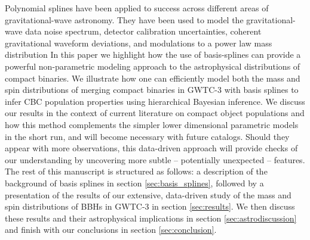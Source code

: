 Polynomial splines have been applied to success across different areas of gravitational-wave astronomy. They have been used to model the gravitational-wave data noise spectrum, 
detector calibration uncertainties, coherent gravitational waveform deviations, and modulations to a power law mass distribution \citep{Littenberg_2015,Edwards_2018,B_Farr_etal_2014,Edelman_2021,Edelman_2022ApJ}
In this paper we highlight how the use of basis-splines can provide a powerful non-parametric modeling approach to the astrophysical distributions of compact 
binaries. We illustrate how one can efficiently model both the mass and spin distributions of merging compact binaries in GWTC-3 with basis splines to infer CBC population properties using 
hierarchical Bayesian inference. We discuss our results in the context of current literature on compact object populations and how this method complements the simpler lower 
dimensional parametric models in the short run, and will become necessary with future catalogs. Should they appear with more observations, this data-driven approach will provide checks of 
our understanding by uncovering more subtle -- potentially unexpected -- features. The rest of this manuscript is structured as follows: a description of the background of 
basis splines in section \ref{sec:basis_splines}, followed by a presentation of the results of our extensive, data-driven study of the mass and spin distributions of BBHs in GWTC-3 in section 
\ref{sec:results}. We then discuss these results and their astrophysical implications in section \ref{sec:astrodiscussion} and finish with our conclusions in section \ref{sec:conclusion}.